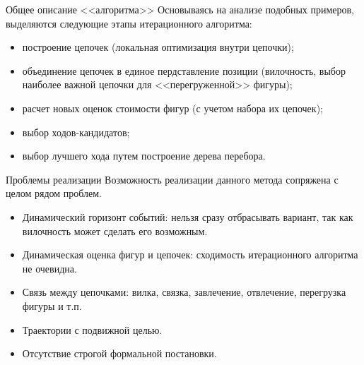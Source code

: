 \begin{frame}{Общее описание <<алгоритма>>}
Основываясь на анализе подобных примеров, выделяются следующие этапы итерационного алгоритма:
\begin{itemize}
\item построение цепочек (локальная оптимизация внутри цепочки);
\item объединение цепочек в единое пердставление позиции (вилочность, выбор наиболее важной цепочки для <<перегруженной>> фигуры);
\item расчет новых оценок стоимости фигур (с учетом набора их цепочек);
\item выбор ходов-кандидатов;
\item выбор лучшего хода путем построение дерева перебора.
\end{itemize} 
\end{frame}

\begin{frame}{Проблемы реализации} %
Возможность реализации данного метода сопряжена с целом рядом проблем.
\begin{itemize}
\item Динамический горизонт событий: нельзя сразу отбрасывать вариант, так как вилочность может сделать его возможным.
\item Динамическая оценка фигур и цепочек: сходимость итерационного алгоритма не очевидна.
\item Связь между цепочками: вилка, связка, завлечение, отвлечение, перегрузка фигуры и т.п.
\item Траектории с подвижной целью.
\item Отсутствие строгой формальной постановки.
\end{itemize}
\end{frame}

\endinput

\subsection{Примеры и обобщения}
\begin{frame}{Примеры на модельных задачах} %
Позиция, \\
анализ, \\ 
пример цепи (цель). 
\end{frame}

\begin{frame}{Обобщение}
Лингвистическая геометрия \\
Экономика
\end{frame}

\begin{frame}{Проблемы} %
Динамический горизонт событий \\
Динамическая оценка фигур и цепей \\
Связь между цепочками \\
Траектории с подвижной целью \\
Оптимальность цепи
\end{frame}

